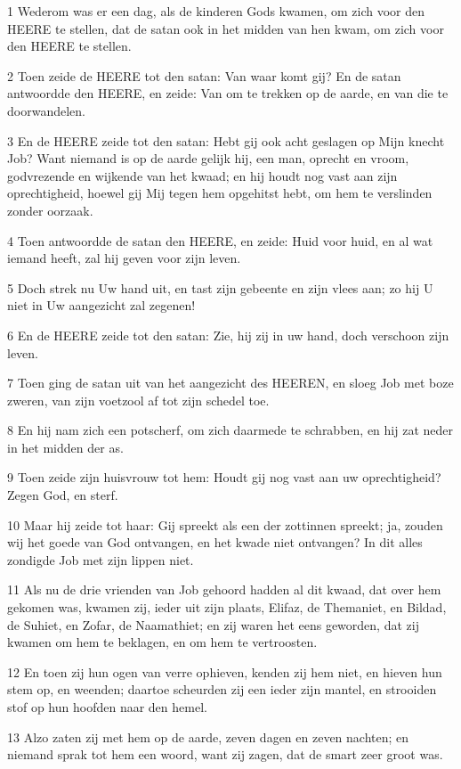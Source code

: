 \par 1 Wederom was er een dag, als de kinderen Gods kwamen, om zich voor den HEERE te stellen, dat de satan ook in het midden van hen kwam, om zich voor den HEERE te stellen.
\par 2 Toen zeide de HEERE tot den satan: Van waar komt gij? En de satan antwoordde den HEERE, en zeide: Van om te trekken op de aarde, en van die te doorwandelen.
\par 3 En de HEERE zeide tot den satan: Hebt gij ook acht geslagen op Mijn knecht Job? Want niemand is op de aarde gelijk hij, een man, oprecht en vroom, godvrezende en wijkende van het kwaad; en hij houdt nog vast aan zijn oprechtigheid, hoewel gij Mij tegen hem opgehitst hebt, om hem te verslinden zonder oorzaak.
\par 4 Toen antwoordde de satan den HEERE, en zeide: Huid voor huid, en al wat iemand heeft, zal hij geven voor zijn leven.
\par 5 Doch strek nu Uw hand uit, en tast zijn gebeente en zijn vlees aan; zo hij U niet in Uw aangezicht zal zegenen!
\par 6 En de HEERE zeide tot den satan: Zie, hij zij in uw hand, doch verschoon zijn leven.
\par 7 Toen ging de satan uit van het aangezicht des HEEREN, en sloeg Job met boze zweren, van zijn voetzool af tot zijn schedel toe.
\par 8 En hij nam zich een potscherf, om zich daarmede te schrabben, en hij zat neder in het midden der as.
\par 9 Toen zeide zijn huisvrouw tot hem: Houdt gij nog vast aan uw oprechtigheid? Zegen God, en sterf.
\par 10 Maar hij zeide tot haar: Gij spreekt als een der zottinnen spreekt; ja, zouden wij het goede van God ontvangen, en het kwade niet ontvangen? In dit alles zondigde Job met zijn lippen niet.
\par 11 Als nu de drie vrienden van Job gehoord hadden al dit kwaad, dat over hem gekomen was, kwamen zij, ieder uit zijn plaats, Elifaz, de Themaniet, en Bildad, de Suhiet, en Zofar, de Naamathiet; en zij waren het eens geworden, dat zij kwamen om hem te beklagen, en om hem te vertroosten.
\par 12 En toen zij hun ogen van verre ophieven, kenden zij hem niet, en hieven hun stem op, en weenden; daartoe scheurden zij een ieder zijn mantel, en strooiden stof op hun hoofden naar den hemel.
\par 13 Alzo zaten zij met hem op de aarde, zeven dagen en zeven nachten; en niemand sprak tot hem een woord, want zij zagen, dat de smart zeer groot was.

